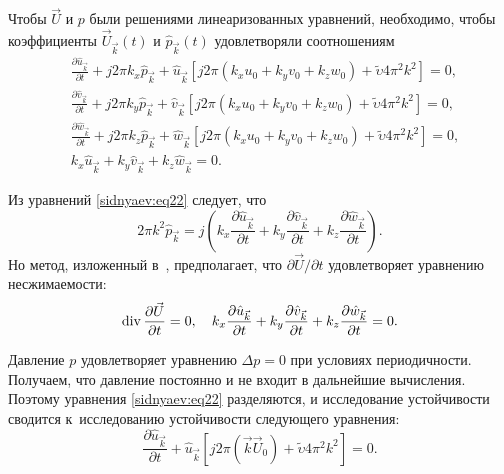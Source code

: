 Чтобы $\vec {U}$ и $p$ были решениями линеаризованных уравнений, необходимо,
чтобы коэффициенты $\vec{U}_{\vec {k}} ( t )$ и $\hat{p}_{\vec {k}} ( t )$ удовлетворяли соотношениям
\begin{equation}
\label{sidnyaev:eq22}
\begin{aligned}
&\frac{\partial \hat {u}_{\vec {k}}}{\partial t}+j2\pi k_x
\hat{p}_{\vec {k}}+\hat{u}_{\vec {k}} \left[ j2\pi (k_x u_0 +k_y v_0 +k_z w_0)+  \tilde{\upsilon}  4\pi^2 k^2 \right]=0, \\
& \frac{\partial \hat{v} _{\vec {k}}}{\partial t}+j2\pi k_y
\hat{p}_{\vec {k}} + \hat{v}_{\vec {k}} \left[ j2\pi ( k_x u_0 +k_y v_0 +k_z w_0 )+  \tilde{\upsilon}  4\pi^2 k^2 \right]=0,\\
& \frac{\partial \hat {w}_{\vec {k}}}{\partial t}+j2\pi k_z
\hat{p}_{\vec {k}}
+\hat{w}_{\vec {k}} \left[ j 2 \pi ( k_x u_0 +k_y v_0 +k_z w_0)+  \tilde{\upsilon}  4\pi ^2k^2 \right]=0,\\
& k_x \hat{u}_{\vec {k}} +k_y \hat {v}_{\vec {k}} +k_z
\hat{w}_{\vec {k}} =0.
\end{aligned}
\end{equation} 


Из уравнений \eqref{sidnyaev:eq22} следует, что
\begin{equation}
\label{sidnyaev:eq23}
2 \pi k^2\hat{p} _{\vec {k}} =j \left( k_x \frac{\partial
\hat{u} _{\vec {k}} }{\partial t}+k_y \frac{\partial \hat
{v} _{\vec {k}} }{\partial t}+k_z \frac{\partial
\hat{w} _{\vec {k}}}{\partial t}\right).
\end{equation}
Но метод, изложенный в~\cite{sidnyaev:bib5,sidnyaev:bib6}, предполагает, что ${\partial \vec
{U}} / {\partial t}$ удовлетворяет уравнению
несжимаемости:
\begin{equation}
\label{sidnyaev:eq231}
\mathop{\rm div}\frac{\partial \vec {U}}{\partial t}=0, \quad
k_x \frac{\partial \hat{u}_{\vec {k}}}{\partial t}+k_y \frac{\partial
\hat {v}_{\vec {k}} }{\partial t}+k_z \frac{\partial
\hat {w}_{\vec {k}}}{\partial t}=0.
\end{equation}

Давление $p$ удовлетворяет уравнению $\Delta p=0$ при условиях
периодичности. Получаем, что давление постоянно и не входит в дальнейшие вычисления. 
Поэтому уравнения \eqref{sidnyaev:eq22} разделяются, и исследование устойчивости сводится к~исследованию устойчивости следующего уравнения:
\[
\frac{\partial
\hat{u}_{\vec {k}}}{\partial t}+ \hat{u}
_{\vec {k}} \left[ j2\pi ( \vec {k}\vec {U}_0  )+  \tilde{\upsilon}  4\pi ^2k^2 \right]=0.
\]

